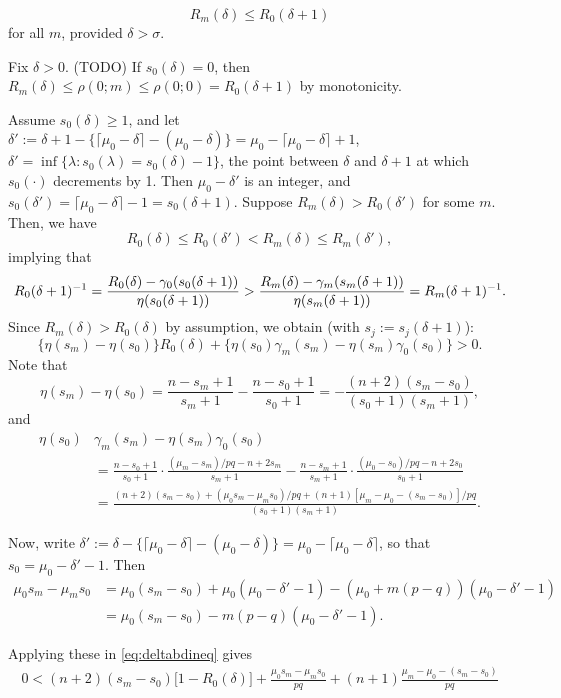 \documentclass[11pt,draft]{article}
\begin{document}
\begin{prop}
\[ R_m(\delta) \leq R_0(\delta + 1) \]
for all $m$, provided $\delta > \sigma$.
\end{prop}
\begin{pf}
Fix $\delta > 0$.
(TODO)
If $s_0(\delta) = 0$, then
$R_m(\delta) \leq \rho(0;m) \leq \rho(0;0) = R_0(\delta+1)$ by
monotonicity.

Assume $s_0(\delta) \geq 1$, and let 
$\delta' := \delta + 1 - \{\lceil \mu_0 - \delta \rceil - (\mu_0 - \delta)\} = \mu_0 - \lceil \mu_0 - \delta \rceil + 1$, \ie 
$\delta' = \inf \{\lambda : s_0(\lambda) = s_0(\delta) - 1\}$, the point between $\delta$ and $\delta + 1$ at which $s_0(\cdot)$ decrements by 1.
Then $\mu_0 - \delta'$ is an integer, and 
$s_0(\delta') = \lceil \mu_0 - \delta \rceil - 1 = s_0(\delta + 1)$.
Suppose $R_m(\delta) > R_0(\delta')$ for some $m$.
Then, we have
\[ R_0(\delta) \leq R_0(\delta') < R_m(\delta) \leq R_m(\delta'),\]
implying that
\[ R_0(\delta + 1)^{-1} = \frac{R_0(\delta) - \gamma_0(s_0(\delta+1))}{\eta(s_0(\delta+1))} > 
\frac{R_m(\delta) - \gamma_m(s_m(\delta+1))}{\eta(s_m(\delta+1))} = R_m(\delta + 1)^{-1}. \]
Since $R_m(\delta) > R_0(\delta)$ by assumption, we obtain (with $s_j := s_j(\delta+1)$):
\begin{equation}\label{eq:deltabdineq}
\big\{\eta(s_m) - \eta(s_0)\big\} R_0(\delta)
 + \big\{\eta(s_0)\gamma_m(s_m) - \eta(s_m)\gamma_0(s_0)\big\} > 0.
\end{equation}
Note that
\[ \eta(s_m) - \eta(s_0)
= \frac{n - s_m + 1}{s_m + 1} - \frac{n - s_0 + 1}{s_0 + 1}
= -\frac{(n + 2)(s_m - s_0)}{(s_0 + 1)(s_m + 1)}, \]
and
\begin{align*}
\eta(s_0)&\gamma_m(s_m) - \eta(s_m)\gamma_0(s_0) \\
&= \frac{n - s_0 + 1}{s_0 + 1}\cdot \frac{(\mu_m - s_m)/pq - n + 2s_m}{s_m + 1} - 
\frac{n - s_m + 1}{s_m + 1}\cdot \frac{(\mu_0-s_0)/ pq - n + 2s_0}{s_0 + 1} \\
 &= \frac{(n+2)(s_m-s_0) + (\mu_0 s_m - \mu_m s_0)/pq + (n+1)[\mu_m - \mu_0 - (s_m - s_0)]/pq}{(s_0 + 1)(s_m + 1)}.
\end{align*}

Now, write $\delta' := \delta - \{\lceil \mu_0 - \delta \rceil - (\mu_0 - \delta)\} = \mu_0 - \lceil \mu_0 - \delta \rceil$, so that
$s_0 = \mu_0 - \delta' - 1$.
Then
\begin{align*}
 \mu_0 s_m - \mu_m s_0 &= \mu_0(s_m - s_0) + \mu_0(\mu_0 - \delta' - 1) - (\mu_0 + m(p-q))(\mu_0 - \delta' - 1) \\
 &= \mu_0(s_m - s_0) - m(p-q)(\mu_0 - \delta' - 1).
\end{align*}


Applying these in \eqref{eq:deltabdineq} gives
\begin{align*}
0 < (n+2)(s_m-s_0)\big[1- R_0(\delta)\big] + \frac{\mu_0 s_m - \mu_m s_0}{pq} + (n+1)\frac{\mu_m - \mu_0 - (s_m - s_0)}{pq}
\end{align*}

\end{pf}
\end{document}
